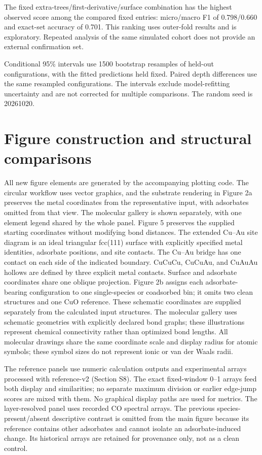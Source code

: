 \documentclass[11pt,a4paper]{article}
\begin{document}


The fixed extra-trees/first-derivative/surface combination has the highest observed score among the compared fixed entries: micro/macro F1 of 0.798/0.660 and exact-set accuracy of 0.701. This ranking uses outer-fold results and is exploratory. Repeated analysis of the same simulated cohort does not provide an external confirmation set.

Conditional 95\% intervals use 1500 bootstrap resamples of held-out configurations, with the fitted predictions held fixed. Paired depth differences use the same resampled configurations. The intervals exclude model-refitting uncertainty and are not corrected for multiple comparisons. The random seed is 20261020.

\section{Figure construction and structural comparisons}
All new figure elements are generated by the accompanying plotting code. The circular workflow uses vector graphics, and the substrate rendering in Figure 2a preserves the metal coordinates from the representative input, with adsorbates omitted from that view. The molecular gallery is shown separately, with one element legend shared by the whole panel. Figure 5 preserves the supplied starting coordinates without modifying bond distances. The extended Cu--Au site diagram is an ideal triangular fcc(111) surface with explicitly specified metal identities, adsorbate positions, and site contacts. The Cu--Au bridge has one contact on each side of the indicated boundary. CuCuCu, CuCuAu, and CuAuAu hollows are defined by three explicit metal contacts. Surface and adsorbate coordinates share one oblique projection. Figure 2b assigns each adsorbate-bearing configuration to one single-species or coadsorbed bin; it omits two clean structures and one CuO reference. These schematic coordinates are supplied separately from the calculated input structures. The molecular gallery uses schematic geometries with explicitly declared bond graphs; these illustrations represent chemical connectivity rather than optimized bond lengths. All molecular drawings share the same coordinate scale and display radius for atomic symbols; these symbol sizes do not represent ionic or van der Waals radii.

The reference panels use numeric calculation outputs and experimental arrays processed with reference-v2 (Section S8). The exact fixed-window 0--1 arrays feed both display and similarities; no separate maximum division or earlier edge-jump scores are mixed with them. No graphical display paths are used for metrics. The layer-resolved panel uses recorded CO spectral arrays. The previous species-present/absent descriptive contrast is omitted from the main figure because its reference contains other adsorbates and cannot isolate an adsorbate-induced change. Its historical arrays are retained for provenance only, not as a clean control.
\end{document}
